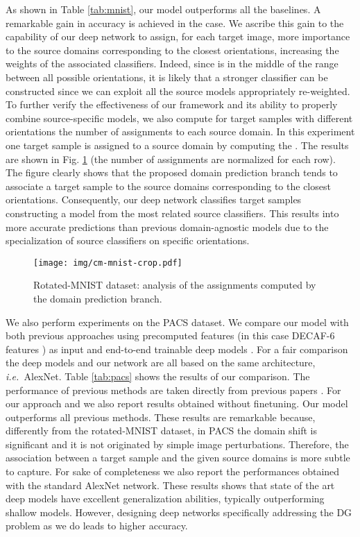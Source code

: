 \documentclass{article}
\newcommand{\ie}{\textit{i.e.~}}
\begin{document}
As shown in Table \ref{tab:mnist}, our model outperforms all the baselines. A remarkable gain in accuracy is achieved in the  case. We ascribe this gain to the capability of our deep network to assign, for each target image, more importance to the source domains corresponding to the closest orientations, increasing the weights of the associated classifiers. Indeed, since  is in the middle of the range between all possible orientations, it is likely that a stronger classifier can be constructed since we can exploit all the source models appropriately re-weighted. To further verify the effectiveness of our framework and its ability to properly combine source-specific models, we also compute for target samples with different orientations the number of assignments to each source domain. In this experiment one target sample  is assigned to a source domain by computing the . The results are shown in Fig. \ref{fig:cm-mnist} (the number of assignments are normalized for each row). The figure clearly shows that the proposed domain prediction branch tends to associate a target sample to the source domains corresponding to the closest orientations. Consequently, our deep network classifies target samples constructing a model from the most related source classifiers. This results into more accurate predictions than previous domain-agnostic models due to the specialization of source classifiers on specific orientations. 

\begin{figure}[t]
\centering
\texttt{[image: img/cm-mnist-crop.pdf]}
    \caption{Rotated-MNIST dataset: analysis of the assignments computed by the domain prediction branch.} 
   \label{fig:cm-mnist}
   \vspace{-0.45cm}
\end{figure}


We also perform experiments on the PACS dataset. We compare our model with both previous approaches using precomputed features (in this case DECAF-6 features \cite{donahue2014decaf}) as input \cite{ghifary2015domain,xu2014exploiting,muandet2013domain} and end-to-end trainable deep models \cite{li2017deeper,li2017learning}. For a fair comparison the deep models \cite{li2017deeper,li2017learning} and our network are all based on the same architecture, \ie AlexNet.  Table \ref{tab:pacs} shows the results of our comparison. The performance of previous methods are taken directly from previous papers \cite{li2017deeper,li2017learning}. For our approach and \cite{li2017deeper} we also report results obtained without finetuning.
Our model outperforms all previous methods. These results are remarkable because, differently from the rotated-MNIST dataset, in PACS the domain shift is significant and it is not originated by simple image perturbations. Therefore, the association between a target sample and the given source domains is more subtle to capture. For sake of completeness we also report the performances obtained with the standard AlexNet network. These results shows that state of the art deep models have excellent generalization abilities, typically outperforming shallow models. However, designing deep networks specifically addressing the DG problem as we do leads to higher accuracy.
\end{document}
